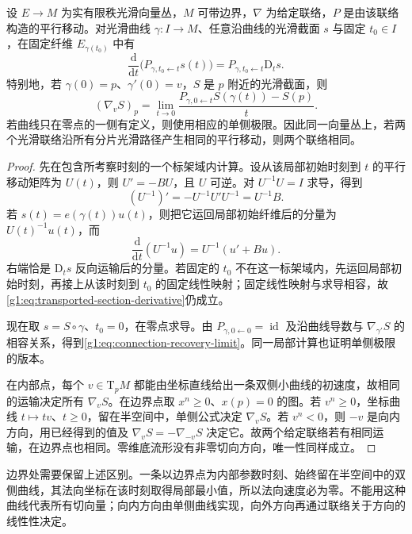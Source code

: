 \begin{theorem}\label{g1:thm:connection-from-transport}
	设 \(E\to M\) 为实有限秩光滑向量丛，\(M\) 可带边界，\(\nabla\) 为给定联络，\(P\) 是由该联络构造的平行移动。对光滑曲线 \(\gamma:I\to M\)、任意沿曲线的光滑截面 \(s\) 与固定 \(t_0\in I\)，在固定纤维 \(E_{\gamma(t_0)}\) 中有
	\begin{equation}\label{g1:eq:transported-section-derivative}
		\frac{\mathrm{d}}{\mathrm{d}t}\bigl(P_{\gamma,t_0\leftarrow t}s(t)\bigr)
		=P_{\gamma,t_0\leftarrow t}\mathrm{D}_t s.
	\end{equation}
	特别地，若 \(\gamma(0)=p\)、\(\gamma'(0)=v\)，\(S\) 是 \(p\) 附近的光滑截面，则
	\begin{equation}\label{g1:eq:connection-recovery-limit}
		(\nabla_vS)_p
		=\lim_{t\to0}\frac{P_{\gamma,0\leftarrow t}S(\gamma(t))-S(p)}{t}.
	\end{equation}
	若曲线只在零点的一侧有定义，则使用相应的单侧极限。因此同一向量丛上，若两个光滑联络沿所有分片光滑路径产生相同的平行移动，则两个联络相同。
\end{theorem}
\begin{proof}
	先在包含所考察时刻的一个标架域内计算。设从该局部初始时刻到 \(t\) 的平行移动矩阵为 \(U(t)\)，则 \(U'=-BU\)，且 \(U\) 可逆。对 \(U^{-1}U=I\) 求导，得到
	\[
		(U^{-1})'=-U^{-1}U'U^{-1}=U^{-1}B.
	\]
	若 \(s(t)=e(\gamma(t))u(t)\)，则把它运回局部初始纤维后的分量为 \(U(t)^{-1}u(t)\)，而
	\[
		\frac{\mathrm{d}}{\mathrm{d}t}(U^{-1}u)=U^{-1}(u'+Bu).
	\]
	右端恰是 \(\mathrm{D}_ts\) 反向运输后的分量。若固定的 \(t_0\) 不在这一标架域内，先运回局部初始时刻，再接上从该时刻到 \(t_0\) 的固定线性映射；固定线性映射与求导相容，故\eqref{g1:eq:transported-section-derivative}仍成立。

	现在取 \(s=S\circ\gamma\)、\(t_0=0\)，在零点求导。由 \(P_{\gamma,0\leftarrow0}=\operatorname{id}\) 及沿曲线导数与 \(\nabla_{\gamma'}S\) 的相容关系，得到\eqref{g1:eq:connection-recovery-limit}。同一局部计算也证明单侧极限的版本。

	在内部点，每个 \(v\in \mathrm{T}_pM\) 都能由坐标直线给出一条双侧小曲线的初速度，故相同的运输决定所有 \(\nabla_vS\)。在边界点取 \(x^n\ge0\)、\(x(p)=0\) 的图。若 \(v^n\ge0\)，坐标曲线 \(t\mapsto tv\)、\(t\ge0\)，留在半空间中，单侧公式决定 \(\nabla_vS\)。若 \(v^n<0\)，则 \(-v\) 是向内方向，用已经得到的值及 \(\nabla_vS=-\nabla_{-v}S\) 决定它。故两个给定联络若有相同运输，在边界点也相同。零维底流形没有非零切向方向，唯一性同样成立。
\end{proof}

边界处需要保留上述区别。一条以边界点为内部参数时刻、始终留在半空间中的双侧曲线，其法向坐标在该时刻取得局部最小值，所以法向速度必为零。不能用这种曲线代表所有切向量；向内方向由单侧曲线实现，向外方向再通过联络关于方向的线性性决定。

